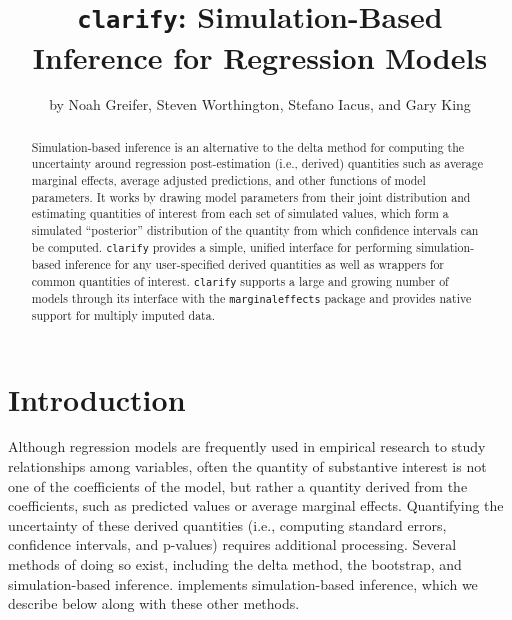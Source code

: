 \title{\texttt{clarify}: Simulation-Based Inference for Regression Models}


\author{by Noah Greifer, Steven Worthington, Stefano Iacus, and Gary King}

\maketitle

\begin{abstract}%
Simulation-based inference is an alternative to the delta method for computing the uncertainty around regression post-estimation (i.e., derived) quantities such as average marginal effects, average adjusted predictions, and other functions of model parameters. It works by drawing model parameters from their joint distribution and estimating quantities of interest from each set of simulated values, which form a simulated ``posterior'' distribution of the quantity from which confidence intervals can be computed. \texttt{clarify} provides a simple, unified interface for performing simulation-based inference for any user-specified derived quantities as well as wrappers for common quantities of interest. \texttt{clarify} supports a large and growing number of models through its interface with the \texttt{marginaleffects} package and provides native support for multiply imputed data.
\end{abstract}

\section{Introduction}\label{introduction}

Although regression models are frequently used in empirical research to study relationships among variables, often the quantity of substantive interest is not one of the coefficients of the model, but rather a quantity derived from the coefficients, such as predicted values or average marginal effects. Quantifying the uncertainty of these derived quantities (i.e., computing standard errors, confidence intervals, and p-values) requires additional processing. Several methods of doing so exist, including the delta method, the bootstrap, and simulation-based inference.  implements simulation-based inference, which we describe below along with these other methods.


